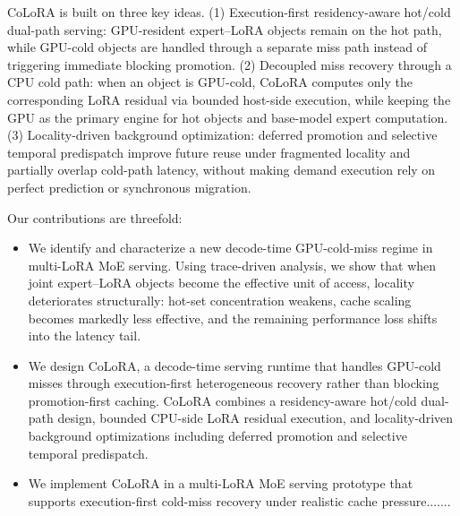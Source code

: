 \documentclass[sigplan,anonymous,review,nonacm]{acmart}
\begin{document}
CoLoRA is built on three key ideas. (1) Execution-first residency-aware hot/cold dual-path serving: GPU-resident expert--LoRA objects remain on the hot path, while GPU-cold objects are handled through a separate miss path instead of triggering immediate blocking promotion. (2) Decoupled miss recovery through a CPU cold path: when an object is GPU-cold, CoLoRA computes only the corresponding LoRA residual via bounded host-side execution, while keeping the GPU as the primary engine for hot objects and base-model expert computation. (3) Locality-driven background optimization: deferred promotion and selective temporal predispatch improve future reuse under fragmented locality and partially overlap cold-path latency, without making demand execution rely on perfect prediction or synchronous migration.

Our contributions are threefold:
\begin{itemize}

  \item We identify and characterize a new decode-time GPU-cold-miss regime in multi-LoRA MoE serving. Using trace-driven analysis, we show that when joint expert--LoRA objects become the effective unit of access, locality deteriorates structurally: hot-set concentration weakens, cache scaling becomes markedly less effective, and the remaining performance loss shifts into the latency tail.

 \item We design CoLoRA, a decode-time serving runtime that handles GPU-cold misses through execution-first heterogeneous recovery rather than blocking promotion-first caching. CoLoRA combines a residency-aware hot/cold dual-path design, bounded CPU-side LoRA residual execution, and locality-driven background optimizations including deferred promotion and selective temporal predispatch.

  \item We implement CoLoRA in a multi-LoRA MoE serving prototype that supports execution-first cold-miss recovery under realistic cache pressure.......

\end{itemize}
\end{document}
